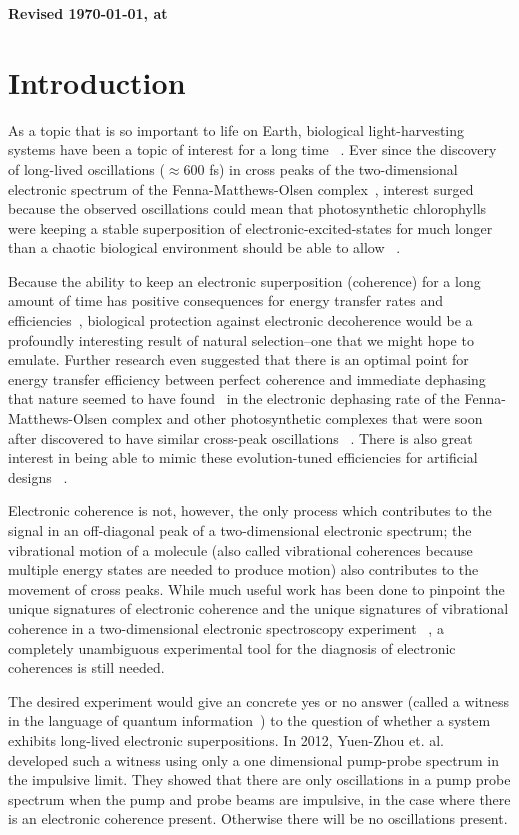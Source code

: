 \textbf{Revised \today , at \currenttime}

\section{Introduction}

As a topic that is so important to life on Earth, biological light-harvesting systems have been a topic of interest for a long time ~\cite{Blankenship2002}.   Ever since the discovery of long-lived oscillations ($\approx$600 fs) in cross peaks of the two-dimensional electronic spectrum of the Fenna-Matthews-Olsen complex~\cite{FMO1}, interest surged because the observed oscillations could mean that photosynthetic chlorophylls were keeping a stable superposition of electronic-excited-states for much longer than a chaotic biological environment should be able to allow ~\cite{FMO2,Lambert2012}.

Because the ability to keep an electronic superposition (coherence) for a long amount of time has positive consequences for energy transfer rates and efficiencies~\cite{FMO1}, biological protection against electronic decoherence would be a profoundly interesting result of natural selection--one that we might hope to emulate.  Further research even suggested that there is an optimal point for energy transfer efficiency between perfect coherence and immediate dephasing that nature seemed to have found~\cite{energyTransfer} in the electronic dephasing rate of the Fenna-Matthews-Olsen complex and other photosynthetic complexes that were soon after discovered to have similar cross-peak oscillations ~\cite{Panitchayangkoon2011,Fidler2013,Collini2010}.  There is also great interest in being able to mimic these evolution-tuned efficiencies for artificial designs ~\cite{Creatore2013}.

Electronic coherence is not, however, the only process which contributes to the signal in an off-diagonal peak of a two-dimensional electronic spectrum; the vibrational motion of a molecule (also called vibrational coherences because multiple energy states are needed to produce motion) also contributes to the movement of cross peaks.  While much useful work has been done to pinpoint the  unique signatures of electronic coherence and the unique signatures of vibrational coherence in a two-dimensional electronic spectroscopy experiment ~\cite{FMO2,mech2,mech3,mech1,mech4}, a completely unambiguous experimental tool for the diagnosis of electronic coherences is still needed.

The desired experiment would give an concrete yes or no answer (called a witness in the language of quantum information~\cite{Chuang2005}) to the question of whether a system exhibits long-lived electronic superpositions.  In 2012, Yuen-Zhou et. al.~\cite{witness} developed such a witness using only a one dimensional pump-probe spectrum in the impulsive limit.  They showed that there are only oscillations in a pump probe spectrum when the pump and probe beams are impulsive, in the case where there is an electronic coherence present.  Otherwise there will be no oscillations present.


